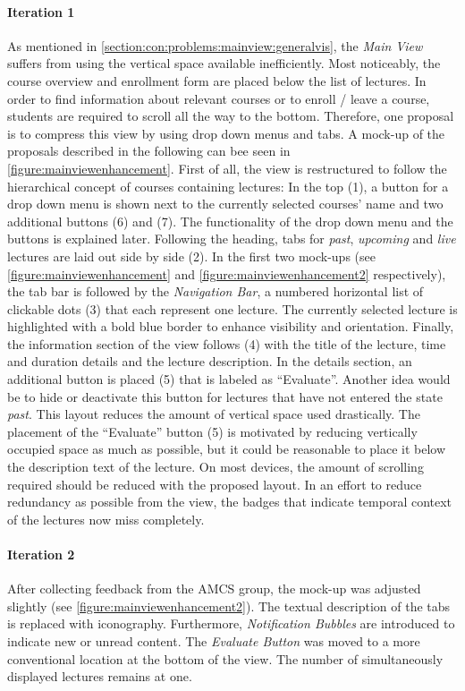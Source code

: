 \paragraph{Iteration 1}
As mentioned in \autoref{section:con:problems:mainview:generalvis}, the \emph{Main View} suffers from using the vertical space available inefficiently. Most noticeably, the course overview and enrollment form are placed below the list of lectures. In order to find information about relevant courses or to enroll / leave a course, students are required to scroll all the way to the bottom. 
Therefore, one proposal is to compress this view by using drop down menus and tabs. A mock-up of the proposals described in the following can bee seen in \autoref{figure:mainviewenhancement}. First of all, the view is restructured to follow the hierarchical concept of courses containing lectures: In the top (1), a button for a drop down menu is shown next to the currently selected courses' name and two additional buttons (6) and (7). The functionality of the drop down menu and the buttons is explained later.
Following the heading, tabs for \emph{past}, \emph{upcoming} and \emph{live} lectures are laid out side by side (2). In the first two mock-ups (see \autoref{figure:mainviewenhancement} and \autoref{figure:mainviewenhancement2} respectively), the tab bar is followed by the \emph{Navigation Bar}, a numbered horizontal list of clickable dots (3) that each represent one lecture. The currently selected lecture is highlighted with a bold blue border to enhance visibility and orientation. Finally, the information section of the view follows (4) with the title of the lecture, time and duration details and the lecture description. In the details section, an additional button is placed (5) that is labeled as “Evaluate”. Another idea would be to hide or deactivate this button for lectures that have not entered the state \emph{past}.
This layout reduces the amount of vertical space used drastically. The placement of the “Evaluate” button (5) is motivated by reducing vertically occupied space as much as possible, but it could be reasonable to place it below the description text of the lecture. On most devices, the amount of scrolling required should be reduced with the proposed layout. In an effort to reduce redundancy as possible from the view, the badges that indicate temporal context of the lectures now miss completely.

\paragraph{Iteration 2}
After collecting feedback from the AMCS group, the mock-up was adjusted slightly (see \autoref{figure:mainviewenhancement2}). The textual description of the tabs is replaced with iconography. Furthermore, \emph{Notification Bubbles} are introduced to indicate new or unread content. The \emph{Evaluate Button} was moved to a more conventional location at the bottom of the view. The number of simultaneously displayed lectures remains at one.

